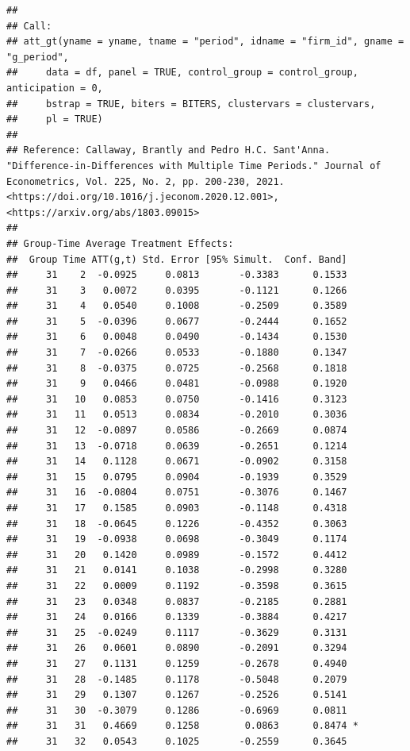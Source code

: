 \documentclass[
]{article}
\begin{document}
\begin{verbatim}
## 
## Call:
## att_gt(yname = yname, tname = "period", idname = "firm_id", gname = "g_period", 
##     data = df, panel = TRUE, control_group = control_group, anticipation = 0, 
##     bstrap = TRUE, biters = BITERS, clustervars = clustervars, 
##     pl = TRUE)
## 
## Reference: Callaway, Brantly and Pedro H.C. Sant'Anna.  "Difference-in-Differences with Multiple Time Periods." Journal of Econometrics, Vol. 225, No. 2, pp. 200-230, 2021. <https://doi.org/10.1016/j.jeconom.2020.12.001>, <https://arxiv.org/abs/1803.09015> 
## 
## Group-Time Average Treatment Effects:
##  Group Time ATT(g,t) Std. Error [95% Simult.  Conf. Band]  
##     31    2  -0.0925     0.0813       -0.3383      0.1533  
##     31    3   0.0072     0.0395       -0.1121      0.1266  
##     31    4   0.0540     0.1008       -0.2509      0.3589  
##     31    5  -0.0396     0.0677       -0.2444      0.1652  
##     31    6   0.0048     0.0490       -0.1434      0.1530  
##     31    7  -0.0266     0.0533       -0.1880      0.1347  
##     31    8  -0.0375     0.0725       -0.2568      0.1818  
##     31    9   0.0466     0.0481       -0.0988      0.1920  
##     31   10   0.0853     0.0750       -0.1416      0.3123  
##     31   11   0.0513     0.0834       -0.2010      0.3036  
##     31   12  -0.0897     0.0586       -0.2669      0.0874  
##     31   13  -0.0718     0.0639       -0.2651      0.1214  
##     31   14   0.1128     0.0671       -0.0902      0.3158  
##     31   15   0.0795     0.0904       -0.1939      0.3529  
##     31   16  -0.0804     0.0751       -0.3076      0.1467  
##     31   17   0.1585     0.0903       -0.1148      0.4318  
##     31   18  -0.0645     0.1226       -0.4352      0.3063  
##     31   19  -0.0938     0.0698       -0.3049      0.1174  
##     31   20   0.1420     0.0989       -0.1572      0.4412  
##     31   21   0.0141     0.1038       -0.2998      0.3280  
##     31   22   0.0009     0.1192       -0.3598      0.3615  
##     31   23   0.0348     0.0837       -0.2185      0.2881  
##     31   24   0.0166     0.1339       -0.3884      0.4217  
##     31   25  -0.0249     0.1117       -0.3629      0.3131  
##     31   26   0.0601     0.0890       -0.2091      0.3294  
##     31   27   0.1131     0.1259       -0.2678      0.4940  
##     31   28  -0.1485     0.1178       -0.5048      0.2079  
##     31   29   0.1307     0.1267       -0.2526      0.5141  
##     31   30  -0.3079     0.1286       -0.6969      0.0811  
##     31   31   0.4669     0.1258        0.0863      0.8474 *
##     31   32   0.0543     0.1025       -0.2559      0.3645  

\end{verbatim}
\end{document}
